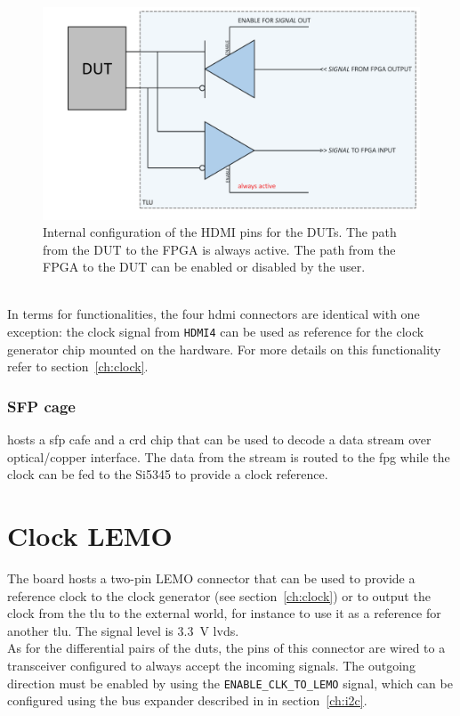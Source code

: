 \begin{figure}
  \centering
  \includegraphics[width=.80\textwidth]{./Images/LVDS_transceiver.pdf}
  \caption{Internal configuration of the HDMI pins for the DUTs. The path from the DUT to the FPGA is always active. The path from the FPGA to the DUT can be enabled or disabled by the user.}\label{fig:LVDSTransceiver}
\end{figure}\\
In terms for functionalities, the four \gls{hdmi} connectors are identical with one exception: the clock signal from \verb|HDMI4| can be used as reference for the clock generator chip mounted on the hardware. For more details on this functionality refer to section~\ref{ch:clock}.

\subsubsection{SFP cage}
\brd hosts a \gls{sfp} cafe and a \gls{crd} chip that can be used to decode a data stream over optical/copper interface. The data from the stream is routed to the \gls{fpg} while the clock can be fed to the Si5345 to provide a clock reference.

\section{Clock LEMO}
The board hosts a two-pin LEMO connector that can be used to provide a reference clock to the clock generator (see section~\ref{ch:clock}) or to output the clock from the \gls{tlu} to the external world, for instance to use it as a reference for another \gls{tlu}. The signal level is 3.3~V \gls{lvds}.\\
As for the differential pairs of the \gls{dut}s, the pins of this connector are wired to a transceiver configured to always accept the incoming signals. The outgoing direction must be enabled by using the \verb|ENABLE_CLK_TO_LEMO| signal, which can be configured using the bus expander described in in section~\ref{ch:i2c}.

